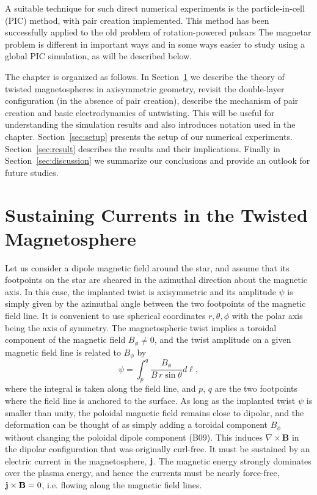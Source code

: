 A suitable technique for such direct numerical experiments is the particle-in-cell
(PIC) method, with pair creation implemented. This method has been
successfully applied to the old problem of rotation-powered pulsars
\citetext{\citealp{chen_electrodynamics_2014}, hereafter CB14; \citealp{philippov_ab_2015}; \citealp{belyaev_dissipation_2014}; \citealp{cerutti_particle_2015}}
The magnetar problem is different in important ways and in some ways
easier to study using a global PIC simulation, as will be described below.

The chapter is organized as follows. In Section~\ref{sec:theory} we describe the theory of
twisted magnetospheres in axisymmetric geometry, revisit the double-layer
configuration (in the absence of pair creation), describe
the mechanism of pair creation and basic electrodynamics of untwisting.
This will be useful for understanding the simulation results and also introduces
notation used in the chapter.
Section~\ref{sec:setup} presents the setup of our numerical experiments.
Section~\ref{sec:result} describes the results and their implications.
Finally in Section~\ref{sec:discussion} we summarize our conclusions and provide an outlook for future studies.


\section{Sustaining Currents in the Twisted Magnetosphere}
\label{sec:theory}


Let us consider a dipole magnetic field around the star,
and assume that its footpoints on the star are sheared in the azimuthal direction
about the magnetic axis. In this case,
the implanted twist is axisymmetric and its amplitude $\psi$ is
simply
given by the azimuthal
angle between the two footpoints of the magnetic field line.
It is convenient to use spherical coordinates $r,\theta,\phi$ with the polar axis being
the axis of symmetry. The magnetospheric twist implies a toroidal component of
the magnetic field $B_\phi\neq 0$, and the twist amplitude on a given magnetic field
line is related to $B_\phi$ by
\begin{equation}
  \label{eq:twist-angle}
  \psi = \int_p^q \frac{B_{\phi}}{B\,r\sin\theta}d \ell,
\end{equation}
where the integral is taken along the field line, and $p$, $q$ are the two
footpoints where the field line is anchored to the surface. As long as the
implanted twist $\psi$ is smaller than unity, the poloidal magnetic field
remains close to dipolar, and the deformation can be thought of as simply adding
a toroidal component $B_{\phi}$ without changing the poloidal dipole component
(B09). This induces $\nabla\times \mathbf{B}$ in the dipolar configuration that
was originally curl-free. It must be sustained by an electric current in the
magnetosphere, ${\mathbf j}$. The magnetic energy strongly dominates over the plasma
energy, and hence the currents must be nearly force-free, ${\mathbf j}\times{\mathbf B}=0$, i.e.
flowing along the magnetic field lines.

